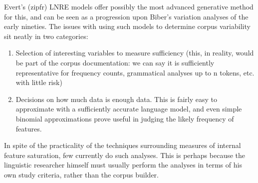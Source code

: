 Evert's (zipfr) LNRE models offer possibly the most advanced generative method for this, and can be seen as a progression upon Biber's variation analyses of the early nineties.  The issues with using such models to determine corpus variability sit neatly in two categories:

\begin{enumerate}
 \item Selection of interesting variables to measure sufficiency (this, in reality, would be part of the corpus documentation: we can say it is sufficiently representative for frequency counts, grammatical analyses up to n tokens, etc. with little risk)
 \item Decisions on how much data is enough data.  This is fairly easy to approximate with a sufficiently accurate language model, and even simple binomial approximations prove useful in judging the likely frequency of features.
\end{enumerate}

In spite of the practicality of the techniques surrounding measures of internal feature saturation, few currently do such analyses.  This is perhaps because the linguistic researcher himself must usually perform the analyses in terms of his own study criteria, rather than the corpus builder.







